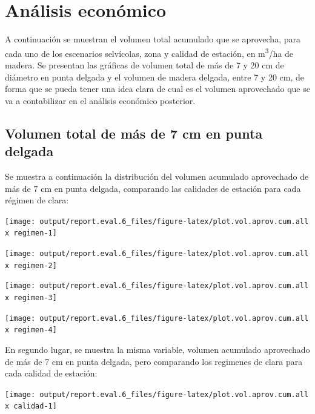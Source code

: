 \documentclass[]{article}
\begin{document}
\section{Análisis económico}\label{anuxe1lisis-econuxf3mico}

A continuación se muestran el volumen total acumulado que se aprovecha,
para cada uno de los escenarios selvícolas, zona y calidad de estación,
en m\textsuperscript{3}/ha de madera. Se presentan las gráficas de
volumen total de más de 7 y 20 cm de diámetro en punta delgada y el
volumen de madera delgada, entre 7 y 20 cm, de forma que se pueda tener
una idea clara de cual es el volumen aprovechado que se va a
contabilizar en el análisis económico posterior.

\subsection{Volumen total de más de 7 cm en punta
delgada}\label{volumen-total-de-muxe1s-de-7-cm-en-punta-delgada}

Se muestra a continuación la distribución del volumen acumulado
aprovechado de más de 7 cm en punta delgada, comparando las calidades de
estación para cada régimen de clara:

\begin{center}\texttt{[image: output/report.eval.6\_files/figure-latex/plot.vol.aprov.cum.all x regimen-1]} \end{center}

\begin{center}\texttt{[image: output/report.eval.6\_files/figure-latex/plot.vol.aprov.cum.all x regimen-2]} \end{center}

\begin{center}\texttt{[image: output/report.eval.6\_files/figure-latex/plot.vol.aprov.cum.all x regimen-3]} \end{center}

\begin{center}\texttt{[image: output/report.eval.6\_files/figure-latex/plot.vol.aprov.cum.all x regimen-4]} \end{center}

En segundo lugar, se muestra la misma variable, volumen acumulado
aprovechado de más de 7 cm en punta delgada, pero comparando los
regimenes de clara para cada calidad de estación:

\begin{center}\texttt{[image: output/report.eval.6\_files/figure-latex/plot.vol.aprov.cum.all x calidad-1]} \end{center}
\end{document}
